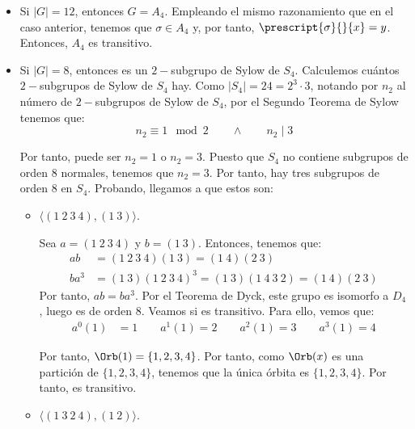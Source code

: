 \begin{ejercicio}
\begin{enumerate}
\begin{itemize}
            \item Si $|G|=12$, entonces $G=A_4$. Empleando el mismo razonamiento que en el caso anterior, tenemos que $\sigma\in A_4$ y, por tanto, $\prescript{\sigma}{}{x} = y$. Entonces, $A_4$ es transitivo.
            
            \item Si $|G|=8$, entonces es un $2-$subgrupo de Sylow de $S_4$. Calculemos cuántos $2-$subgrupos de Sylow de $S_4$ hay. Como $|S_4|=24=2^3\cdot 3$, notando por $n_2$ al número de $2-$subgrupos de Sylow de $S_4$, por el Segundo Teorema de Sylow tenemos que:
            \begin{equation*}
                n_2 \equiv 1 \mod 2 \qquad\land \qquad n_2 \mid 3
            \end{equation*}

            Por tanto, puede ser $n_2=1$ o $n_2=3$. Puesto que $S_4$ no contiene subgrupos de orden $8$ normales, tenemos que $n_2=3$. Por tanto, hay tres subgrupos de orden $8$ en $S_4$. Probando, llegamos a que estos son:
            \begin{itemize}
                \item $\langle (1\ 2\ 3\ 4), (1\ 3)\rangle$.
                
                Sea $a=(1\ 2\ 3\ 4)$ y $b=(1\ 3)$. Entonces, tenemos que:
                \begin{align*}
                    ab &= (1\ 2\ 3\ 4)(1\ 3) = (1\ 4)(2\ 3)\\
                    ba^3 &= (1\ 3)(1\ 2\ 3\ 4)^3
                    = (1\ 3)(1\ 4\ 3\ 2) = (1\ 4)(2\ 3)
                \end{align*}
                Por tanto, $ab=ba^3$. Por el Teorema de Dyck, este grupo es isomorfo a $D_4$, luego es de orden $8$. Veamos si es transitivo. Para ello, vemos que:
                \begin{align*}
                    a^0(1) &= 1 \qquad
                    a^1(1) = 2 \qquad
                    a^2(1) = 3 \qquad
                    a^3(1) = 4
                \end{align*}

                Por tanto, $\Orb(1)=\{1, 2, 3, 4\}$. Por tanto, como $\Orb(x)$ es una partición de $\{1, 2, 3, 4\}$, tenemos que la única órbita es $\{1, 2, 3, 4\}$. Por tanto, es transitivo.

                \item $\langle (1\ 3\ 2\ 4), (1\ 2)\rangle$.
                

\end{itemize}
\end{itemize}
\end{enumerate}
\end{ejercicio}

